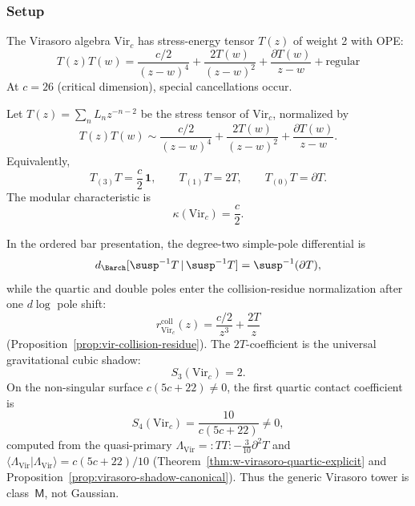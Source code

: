 \subsubsection{Setup}

\begin{definition}
The Virasoro algebra $\text{Vir}_c$ has stress-energy tensor $T(z)$ of weight 2 with OPE:
\[
T(z)T(w) = \frac{c/2}{(z-w)^4} + \frac{2T(w)}{(z-w)^2} + \frac{\partial T(w)}{z-w} + \text{regular}
\]
At $c = 26$ (critical dimension), special cancellations occur.
\end{definition}

\begin{proposition}
\label{prop:virasoro-standard-family-ledger}
Let \(T(z)=\sum_n L_n z^{-n-2}\) be the stress tensor of
\(\mathrm{Vir}_c\), normalized by
\begin{equation}\label{eq:virasoro-ledger-ope}
T(z)T(w)\sim
\frac{c/2}{(z-w)^4}
+\frac{2T(w)}{(z-w)^2}
+\frac{\partial T(w)}{z-w}.
\end{equation}
Equivalently,
\[
T_{(3)}T=\frac c2\,\mathbf1,\qquad
T_{(1)}T=2T,\qquad
T_{(0)}T=\partial T .
\]
The modular characteristic is
\begin{equation}\label{eq:virasoro-ledger-kappa}
\kappa(\mathrm{Vir}_c)=\frac c2 .
\end{equation}

In the ordered bar presentation, the degree-two simple-pole
differential is
\begin{equation}\label{eq:virasoro-ledger-bar-d2}
d_{\Barch}[\susp^{-1}T\,|\,\susp^{-1}T]
=\susp^{-1}(\partial T),
\end{equation}
while the quartic and double poles enter the collision-residue
normalization after one \(d\log\) pole shift:
\begin{equation}\label{eq:virasoro-ledger-r}
r_{\mathrm{Vir}_c}^{\mathrm{coll}}(z)
=\frac{c/2}{z^3}+\frac{2T}{z}
\end{equation}
\textup{(}Proposition~\ref{prop:vir-collision-residue}\textup{)}.
The \(2T\)-coefficient is the universal gravitational cubic shadow:
\[
S_3(\mathrm{Vir}_c)=2.
\]
On the non-singular surface \(c(5c+22)\ne0\), the first quartic
contact coefficient is
\begin{equation}\label{eq:virasoro-ledger-S4}
S_4(\mathrm{Vir}_c)
=\frac{10}{c(5c+22)}
\neq0 ,
\end{equation}
computed from the quasi-primary
\(\Lambda_{\mathrm{Vir}}={:}TT{:}-\frac{3}{10}\partial^2T\) and
\(\langle\Lambda_{\mathrm{Vir}}|\Lambda_{\mathrm{Vir}}\rangle
=c(5c+22)/10\)
\textup{(}Theorem~\ref{thm:w-virasoro-quartic-explicit} and
Proposition~\ref{prop:virasoro-shadow-canonical}\textup{)}.  Thus the
generic Virasoro tower is class~\(\mathsf M\), not Gaussian.


\end{proposition}
